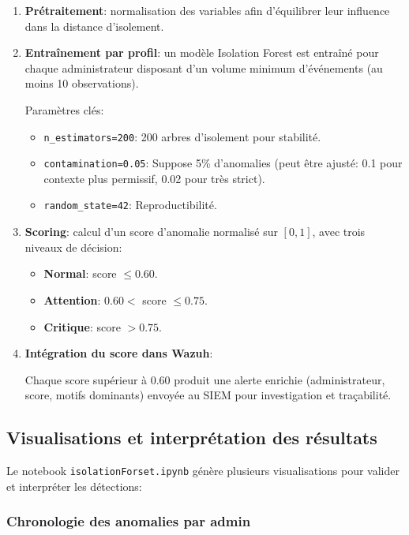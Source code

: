 \begin{enumerate}
	\item \textbf{Prétraitement}: normalisation des variables afin d'équilibrer leur influence dans la distance d'isolement.
	
	\item \textbf{Entraînement par profil}: un modèle Isolation Forest est entraîné pour chaque administrateur disposant d'un volume minimum d'événements (au moins 10 observations).
	
	Paramètres clés:
	\begin{itemize}
		\item \texttt{n\_estimators=200}: 200 arbres d'isolement pour stabilité.
		\item \texttt{contamination=0.05}: Suppose 5\% d'anomalies (peut être ajusté: 0.1 pour contexte plus permissif, 0.02 pour très strict).
		\item \texttt{random\_state=42}: Reproductibilité.
	\end{itemize}
	
	\item \textbf{Scoring}: calcul d'un score d'anomalie normalisé sur $[0,1]$, avec trois niveaux de décision:
	\begin{itemize}
		\item \textbf{Normal}: score $\leq 0.60$.
		\item \textbf{Attention}: $0.60 <$ score $\leq 0.75$.
		\item \textbf{Critique}: score $> 0.75$.
	\end{itemize}
	
	\item \textbf{Intégration du score dans Wazuh}:
	
	Chaque score supérieur à 0.60 produit une alerte enrichie (administrateur, score, motifs dominants) envoyée au SIEM pour investigation et traçabilité.
\end{enumerate}

\subsection{Visualisations et interprétation des résultats}

Le notebook \texttt{isolationForset.ipynb} génère plusieurs visualisations pour valider et interpréter les détections:

\subsubsection{Chronologie des anomalies par admin}


